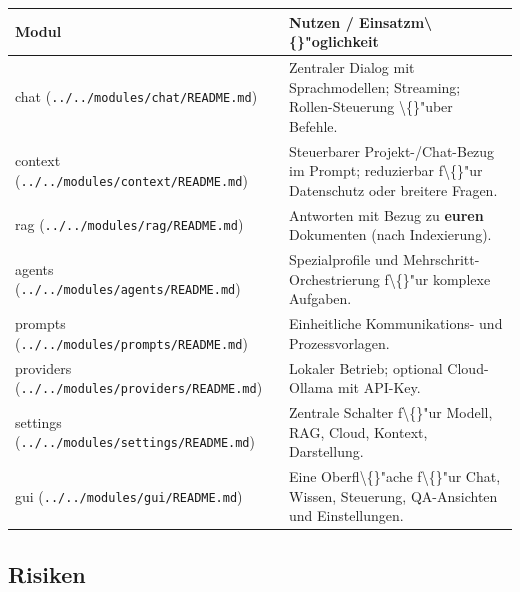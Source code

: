 \begin{center}
\begin{tabular}{ll}
\hline
Modul & Nutzen / Einsatzm\textbackslash\{\}"oglichkeit \\
\hline
chat (\texttt{../../modules/chat/README.md}) & Zentraler Dialog mit Sprachmodellen; Streaming; Rollen-Steuerung \textbackslash\{\}"uber Befehle. \\
context (\texttt{../../modules/context/README.md}) & Steuerbarer Projekt-/Chat-Bezug im Prompt; reduzierbar f\textbackslash\{\}"ur Datenschutz oder breitere Fragen. \\
rag (\texttt{../../modules/rag/README.md}) & Antworten mit Bezug zu \textbf{euren} Dokumenten (nach Indexierung). \\
agents (\texttt{../../modules/agents/README.md}) & Spezialprofile und Mehrschritt-Orchestrierung f\textbackslash\{\}"ur komplexe Aufgaben. \\
prompts (\texttt{../../modules/prompts/README.md}) & Einheitliche Kommunikations- und Prozessvorlagen. \\
providers (\texttt{../../modules/providers/README.md}) & Lokaler Betrieb; optional Cloud-Ollama mit API-Key. \\
settings (\texttt{../../modules/settings/README.md}) & Zentrale Schalter f\textbackslash\{\}"ur Modell, RAG, Cloud, Kontext, Darstellung. \\
gui (\texttt{../../modules/gui/README.md}) & Eine Oberfl\textbackslash\{\}"ache f\textbackslash\{\}"ur Chat, Wissen, Steuerung, QA-Ansichten und Einstellungen. \\
\hline
\end{tabular}
\end{center}

\subsection{Risiken}


